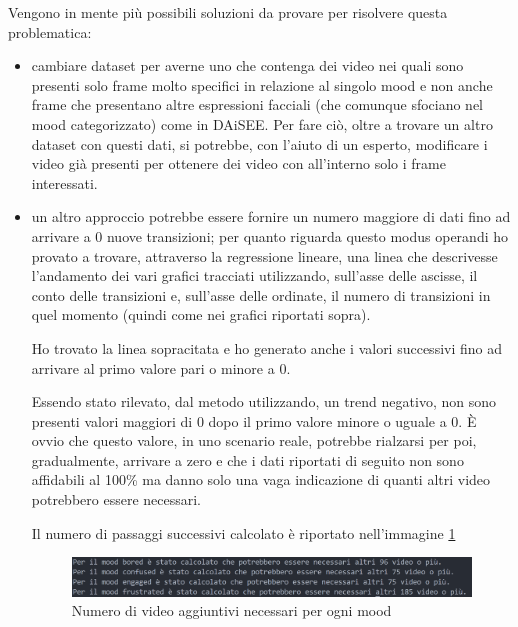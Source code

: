 Vengono in mente più possibili soluzioni da provare per risolvere questa problematica:
\begin {itemize}
\item cambiare dataset per averne uno che contenga dei video nei quali sono presenti solo frame molto specifici in relazione al singolo mood e non anche frame che presentano altre espressioni facciali (che comunque sfociano nel mood categorizzato) come in DAiSEE.
Per fare ciò, oltre a trovare un altro dataset con questi dati, si potrebbe, con l’aiuto di un esperto, modificare i video già presenti per ottenere dei video con all’interno solo i frame interessati.
\item un altro approccio potrebbe essere fornire un numero maggiore di dati fino ad arrivare a 0 nuove transizioni; per quanto riguarda questo modus operandi ho provato a trovare, attraverso la regressione lineare, una linea che descrivesse l’andamento dei vari grafici tracciati utilizzando, sull’asse delle ascisse, il conto delle transizioni e, sull’asse delle ordinate, il numero di transizioni in quel momento (quindi come nei grafici riportati sopra).

Ho trovato la linea sopracitata e ho generato anche i valori successivi fino ad arrivare al primo valore pari o minore a 0. 

Essendo stato rilevato, dal metodo utilizzando, un trend negativo, non sono presenti valori maggiori di 0 dopo il primo valore minore o uguale a 0. È ovvio che questo valore, in uno scenario reale, potrebbe rialzarsi per poi, gradualmente, arrivare a zero e che i dati riportati di seguito non sono affidabili al 100\% ma danno solo una vaga indicazione di quanti altri video potrebbero essere necessari. 

Il numero di passaggi successivi calcolato è riportato nell’immagine \ref{fig:image27}
\begin{figure}
    \begin{center}    
        \includegraphics[width=1\linewidth]{images/passaggi aggiuntivi.png}
        \caption{Numero di video aggiuntivi necessari per ogni mood}
        \label{fig:image27}
    \end{center}
\end{figure}


\end{itemize}
